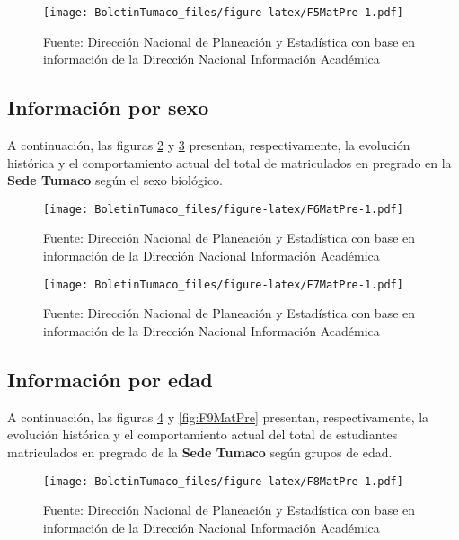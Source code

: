 \documentclass[
]{book}
\begin{document}
\begin{figure}
\centering
\texttt{[image: BoletinTumaco\_files/figure-latex/F5MatPre-1.pdf]}
\caption{\label{fig:F5MatPre}Fuente: Dirección Nacional de Planeación y Estadística con base en información de la Dirección Nacional Información Académica}
\end{figure}

\hypertarget{informaciuxf3n-por-sexo-2}{%
\subsection{Información por sexo}\label{informaciuxf3n-por-sexo-2}}

A continuación, las figuras \ref{fig:F6MatPre} y \ref{fig:F7MatPre} presentan, respectivamente, la evolución histórica y el comportamiento actual del total de matriculados en pregrado en la \textbf{Sede Tumaco} según el sexo biológico.

\begin{figure}
\centering
\texttt{[image: BoletinTumaco\_files/figure-latex/F6MatPre-1.pdf]}
\caption{\label{fig:F6MatPre}Fuente: Dirección Nacional de Planeación y Estadística con base en información de la Dirección Nacional Información Académica}
\end{figure}

\begin{figure}
\centering
\texttt{[image: BoletinTumaco\_files/figure-latex/F7MatPre-1.pdf]}
\caption{\label{fig:F7MatPre}Fuente: Dirección Nacional de Planeación y Estadística con base en información de la Dirección Nacional Información Académica}
\end{figure}

\hypertarget{informaciuxf3n-por-edad-2}{%
\subsection{Información por edad}\label{informaciuxf3n-por-edad-2}}

A continuación, las figuras \ref{fig:F8MatPre} y \ref{fig:F9MatPre} presentan, respectivamente, la evolución histórica y el comportamiento actual del total de estudiantes matriculados en pregrado de la \textbf{Sede Tumaco} según grupos de edad.

\begin{figure}
\centering
\texttt{[image: BoletinTumaco\_files/figure-latex/F8MatPre-1.pdf]}
\caption{\label{fig:F8MatPre}Fuente: Dirección Nacional de Planeación y Estadística con base en información de la Dirección Nacional Información Académica}
\end{figure}
\end{document}

